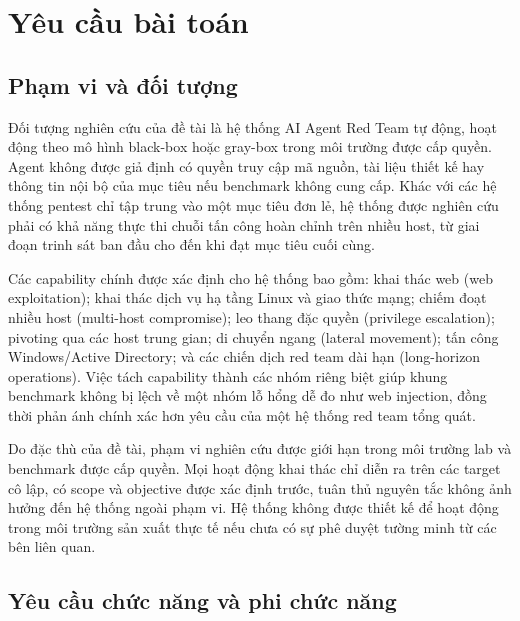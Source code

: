 
\section{Yêu cầu bài toán}
\label{sec:yeu-cau-bai-toan}

\subsection{Phạm vi và đối tượng}
\label{sec:pham-vi-doi-tuong}

Đối tượng nghiên cứu của đề tài là hệ thống AI Agent Red Team tự động, hoạt động theo mô hình black-box hoặc gray-box trong môi trường được cấp quyền. Agent không được giả định có quyền truy cập mã nguồn, tài liệu thiết kế hay thông tin nội bộ của mục tiêu nếu benchmark không cung cấp. Khác với các hệ thống pentest chỉ tập trung vào một mục tiêu đơn lẻ, hệ thống được nghiên cứu phải có khả năng thực thi chuỗi tấn công hoàn chỉnh trên nhiều host, từ giai đoạn trinh sát ban đầu cho đến khi đạt mục tiêu cuối cùng.

Các capability chính được xác định cho hệ thống bao gồm: khai thác web (web exploitation); khai thác dịch vụ hạ tầng Linux và giao thức mạng; chiếm đoạt nhiều host (multi-host compromise); leo thang đặc quyền (privilege escalation); pivoting qua các host trung gian; di chuyển ngang (lateral movement); tấn công Windows/Active Directory; và các chiến dịch red team dài hạn (long-horizon operations). Việc tách capability thành các nhóm riêng biệt giúp khung benchmark không bị lệch về một nhóm lỗ hổng dễ đo như web injection, đồng thời phản ánh chính xác hơn yêu cầu của một hệ thống red team tổng quát.

Do đặc thù của đề tài, phạm vi nghiên cứu được giới hạn trong môi trường lab và benchmark được cấp quyền. Mọi hoạt động khai thác chỉ diễn ra trên các target cô lập, có scope và objective được xác định trước, tuân thủ nguyên tắc không ảnh hưởng đến hệ thống ngoài phạm vi. Hệ thống không được thiết kế để hoạt động trong môi trường sản xuất thực tế nếu chưa có sự phê duyệt tường minh từ các bên liên quan.

\subsection{Yêu cầu chức năng và phi chức năng}
\label{sec:yeu-cau-chuc-nang-phi-chuc-nang}

